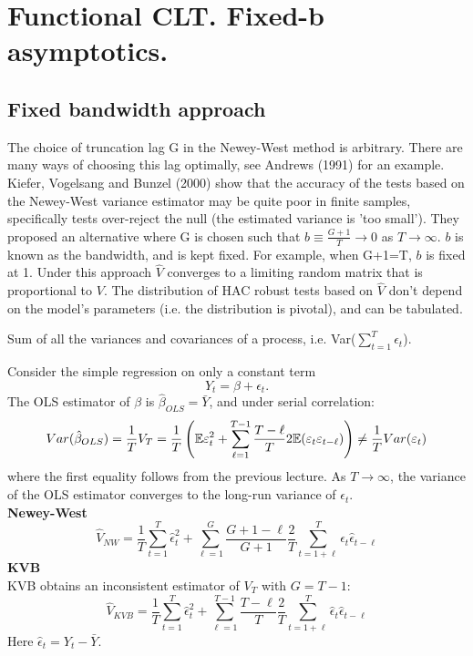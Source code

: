 \documentclass[DIV=14,titlepage=false]{scrreprt}
\begin{document}
\setcounter{chapter}{8}
\vspace{-10pt}


\chapter{Functional CLT. Fixed-b asymptotics.}

\section{Fixed bandwidth approach}
The choice of truncation lag G in the Newey-West method is arbitrary. There are many ways of choosing this lag optimally, see Andrews (1991) for an example. \\
Kiefer, Vogelsang and Bunzel (2000) show that the accuracy of the tests based on the Newey-West variance estimator may be quite poor in finite samples, specifically tests over-reject the null (the estimated variance is 'too small'). They proposed an alternative where G is chosen such that $b\equiv \frac{G+1}{T}\to 0$ as $T\to \infty$. $b$ is known as the bandwidth, and is kept fixed. For example, when G+1=T, $b$ is fixed at 1. Under this approach $\hat V$ converges to a limiting random matrix that is proportional to $V$. The distribution of HAC robust tests based on $\hat V$ don't depend on the model's parameters (i.e. the distribution is pivotal), and can be tabulated.

\begin{definition}
    Sum of all the variances and covariances of a process, i.e. Var($\sum_{t=1}^T \epsilon_t$).
\end{definition}


    Consider the simple regression on only a constant term \[ Y_t = \beta + \epsilon_t.\] The OLS estimator of $\beta$ is $\hat \beta_{OLS} = \bar Y$, and under serial correlation:
    \[
    Var(\hat \beta_{OLS})=\frac{1}{T} V_T = \frac{1}{T} \left(\mathbb{E} \varepsilon_t^2 + \sum_{\ell=1}^{T-1}\frac{T-\ell}{T} 2\mathbb{E}(\varepsilon_t \varepsilon_{t-\ell}) \right) \not = \frac{1}{T} Var(\varepsilon_t)
    \]
    where the first equality follows from the previous lecture. As $T\to \infty$, the variance of the OLS estimator converges to the long-run variance of $\epsilon_t$. \\
    \textbf{Newey-West}
    \[
    \hat V_{NW} = \frac{1}{T} \sum_{t=1}^{T} \hat \epsilon_t^2 + \sum_{\ell=1}^{G}\frac{G+1-\ell}{G+1} \frac{2}{T} \sum_{t=1+\ell}^{T} \hat \epsilon_t \hat \epsilon_{t-\ell}\]
    \textbf{KVB}\\
    KVB obtains an inconsistent estimator of $V_T$ with $G=T-1$:
    \[
        \hat{V}_{KVB} = \frac{1}{T} \sum_{t=1}^{T} \hat \epsilon_t^2 + \sum_{\ell=1}^{T-1}\frac{T-\ell}{T} \frac{2}{T} \sum_{t=1+\ell}^{T} \hat \epsilon_t \hat \epsilon_{t-\ell}
    \]
    Here $\hat \epsilon_t= Y_t - \bar Y$.
\end{document}
